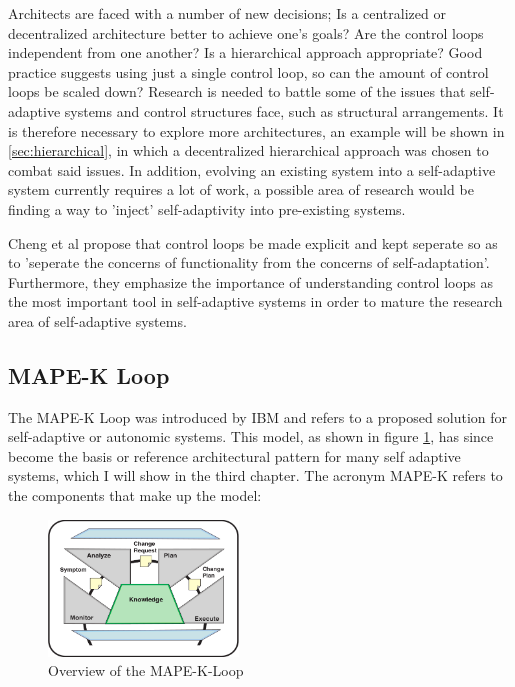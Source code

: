     
    \quad Architects are faced with a number of new decisions;
    Is a centralized or decentralized architecture better to achieve one's goals? Are the control loops independent from one another?
    Is a hierarchical approach appropriate? Good practice suggests using just a single control loop\cite{accidents}, so can the amount of control loops be scaled down?
    Research is needed to battle some of the issues that self-adaptive systems and control structures face, such as structural arrangements. 
    It is therefore necessary to explore more architectures, an example will be shown in \ref{sec:hierarchical}, in which a decentralized hierarchical approach was
    chosen to combat said issues. In addition, evolving an existing system into a self-adaptive system currently requires a lot of work, a possible area of research 
    would be finding a way to 'inject' self-adaptivity into pre-existing systems.
    
    \quad Cheng et al propose that control loops be made explicit and kept seperate so as to 'seperate the concerns of functionality from the concerns of self-adaptation'\cite[p. 16]{Cheng:2009:SES:1573856.1573858}.
    Furthermore, they emphasize the importance of understanding control loops as the most important tool in self-adaptive systems in order to mature the research area of self-adaptive systems.
    
    \subsection{MAPE-K Loop}
    \label{sub:mape}
    The MAPE-K Loop was introduced by IBM \cite{Kephart:2003:VAC:642194.642200} and refers to a proposed solution for self-adaptive or autonomic systems.
    This model, as shown in figure \ref{fig:mape}, has since become the basis or reference architectural pattern for many self adaptive systems, which I will show in the third chapter.
    The acronym MAPE-K refers to the components that make up the model:
    \begin{figure}[hbt]
        \centering
        \includegraphics[width=0.45\textwidth]{Bilder/mape.png}
        \caption{
                Overview of the MAPE-K-Loop\cite{Kephart:2003:VAC:642194.642200}
        }
        \label{fig:mape}
    \end{figure}  

